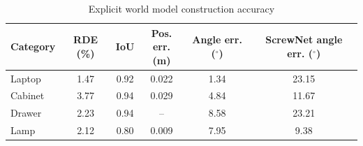 \documentclass[12pt,a4paper,final]{extreport}
\begin{document}
{\renewcommand{\arraystretch}{1.2}
\begin{table}[htbp]
\centering
\caption{Explicit world model construction accuracy \cite{p1}}\label{tab:dex_model}
\small
\begin{tabular}{|l|c|c|c|c|c|}
\hline
\textbf{Category} & \textbf{RDE (\%)} & \textbf{IoU} & \shortstack{\textbf{Pos.}\\\textbf{err. (m)}} & \shortstack{\textbf{Angle}\\\textbf{err. ($^{\circ}$)}} & \shortstack{\textbf{ScrewNet angle}\\\textbf{err. ($^{\circ}$)}} \\ \hline
Laptop & 1.47 & 0.92 & 0.022 & 1.34 & 23.15 \\ \hline
Cabinet & 3.77 & 0.94 & 0.029 & 4.84 & 11.67 \\ \hline
Drawer & 2.23 & 0.94 & -- & 8.58 & 23.21 \\ \hline
Lamp & 2.12 & 0.80 & 0.009 & 7.95 & 9.38 \\ \hline
\end{tabular}
\end{table}}
\end{document}
